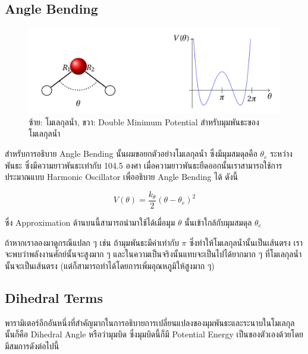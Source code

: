 \subsection{Angle Bending}

\begin{figure}[htbp]
    \centering
    \includegraphics[width=0.8\linewidth]{fig/water-angle-bending.png}
    \caption{ซ้าย: โมเลกุลน้ำ, ขวา: Double Minimum Potential สำหรับมุมพันธะของโมเลกุลน้ำ}
    \label{fig:water_angle_bending}
\end{figure}

สำหรับการอธิบาย Angle Bending นั้นผมขอยกตัวอย่างโมเลกุลน้ำ  ซึ่งมีมุมสมดุลคือ $\theta_{e}$ ระหว่างพันธะ 
ซึ่งมีความยาวพันธะเท่ากับ 104.5 องศา เมื่อความยาวพันธะยืดออกนั้นเราสามารถใช้การประมาณแบบ Harmonic Oscillator เพื่ออธิบาย Angle
Bending ได้ ดังนี้

\begin{equation}
    V(\theta)
    =
    \frac{k_{\theta}}{2}
    (\theta - \theta_{e})^{2}
\end{equation}

\noindent ซึ่ง Approximation ด้านบนนี้สามารถนำมาใช้ได้เมื่อมุม $\theta$ นั้นเข้าใกล้กับมุมสมดุล $\theta_{e}$

ถ้าหากเราลองมาดูกรณีแปลก ๆ เช่น ถ้ามุมพันธะมีค่าเท่ากับ $\pi$ ซึ่งทำให้โมเลกุลน้ำนั้นเป็นเส้นตรง เราจะพบว่าพลังงานศักย์นั้นจะสูงมาก ๆ
และในความเป็นจริงนั้นแทบจะเป็นไปได้ยากมาก ๆ ที่โมเลกุลน้ำนั้นจะเป็นเส้นตรง (แต่ก็สามารถทำได้โดยการเพิ่มอุณหภูมิให้สูงมาก ๆ)

\subsection{Dihedral Terms}

พารามิเตอร์อีกอันหนึ่งที่สำคัญมากในการอธิบายการเปลี่ยนแปลงของมุมพันธะและระนาบในโมเลกุลนั้นก็คือ Dihedral Angle หรือว่ามุมบิด
ซึ่งมุมบิดนี้ก็มี Potential Energy เป็นของตัวเองด้วยโดยมีสมการดังต่อไปนี้

